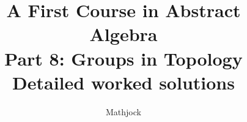 
\title{\textbf{A First Course in Abstract Algebra}\\[0.3em]Part 8: Groups in Topology\\[0.3em]\large Detailed worked solutions}
\author{Mathjock}
\date{}

\maketitle
\bookinfo
\tableofcontents
\clearpage
\renewcommand{\thesection}{41}
\renewcommand{\theHsection}{fraleigh.41}

\clearpage
\renewcommand{\thesection}{42}
\renewcommand{\theHsection}{fraleigh.42}

\clearpage
\renewcommand{\thesection}{43}
\renewcommand{\theHsection}{fraleigh.43}

\clearpage
\renewcommand{\thesection}{44}
\renewcommand{\theHsection}{fraleigh.44}


